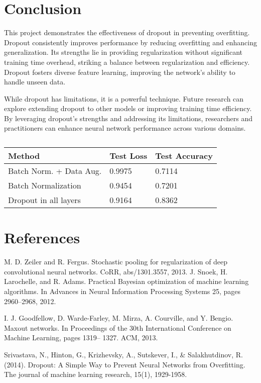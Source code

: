 \documentclass{article}
\begin{document}
\section{Conclusion}
This project demonstrates the effectiveness of dropout in preventing overfitting. Dropout consistently improves performance by reducing overfitting and enhancing generalization. Its strengths lie in providing regularization without significant training time overhead, striking a balance between regularization and efficiency. Dropout fosters diverse feature learning, improving the network's ability to handle unseen data.

While dropout has limitations, it is a powerful technique. Future research can explore extending dropout to other models or improving training time efficiency. By leveraging dropout's strengths and addressing its limitations, researchers and practitioners can enhance neural network performance across various domains.

\begin{table}
\centering
\begin{tabular}{l|l|l}
Method & Test Loss & Test Accuracy \\\hline
Batch Norm. + Data Aug. & 0.9975 & 0.7114 \\ 
Batch Normalization & 0.9454 & 0.7201 \\
Dropout in all layers & 0.9164 & 0.8362  \\
\end{tabular}
\caption{\label{tab:widgets}}
\end{table}

\section{References}
M. D. Zeiler and R. Fergus. Stochastic pooling for regularization of deep convolutional neural networks. CoRR, abs/1301.3557, 2013.
J. Snoek, H. Larochelle, and R. Adams. Practical Bayesian optimization of machine learning algorithms. In Advances in Neural Information Processing Systems 25, pages 2960–2968, 2012.

I. J. Goodfellow, D. Warde-Farley, M. Mirza, A. Courville, and Y. Bengio. Maxout networks. In Proceedings of the 30th International Conference on Machine Learning, pages 1319– 1327. ACM, 2013.

Srivastava, N., Hinton, G., Krizhevsky, A., Sutskever, I., & Salakhutdinov, R. (2014). Dropout: A Simple Way to Prevent Neural Networks from Overfitting. The journal of machine learning research, 15(1), 1929-1958.
\end{document}
